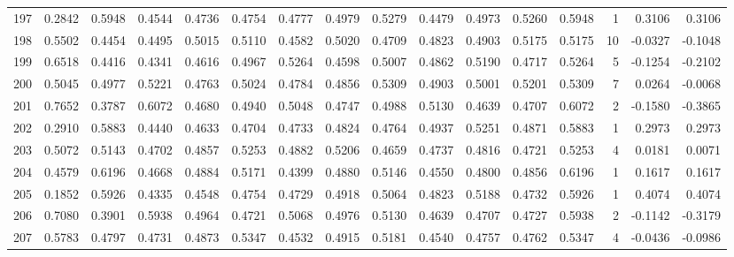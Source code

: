 \begin{tabular}{lrrrrrrrrrrrrrrr}
197 &      0.2842 &  0.5948 &  0.4544 &  0.4736 &  0.4754 &  0.4777 &  0.4979 &  0.5279 &  0.4479 &  0.4973 &   0.5260 &     0.5948 &      1 &                    0.3106 &                     0.3106 \\
198 &      0.5502 &  0.4454 &  0.4495 &  0.5015 &  0.5110 &  0.4582 &  0.5020 &  0.4709 &  0.4823 &  0.4903 &   0.5175 &     0.5175 &     10 &                   -0.0327 &                    -0.1048 \\
199 &      0.6518 &  0.4416 &  0.4341 &  0.4616 &  0.4967 &  0.5264 &  0.4598 &  0.5007 &  0.4862 &  0.5190 &   0.4717 &     0.5264 &      5 &                   -0.1254 &                    -0.2102 \\
200 &      0.5045 &  0.4977 &  0.5221 &  0.4763 &  0.5024 &  0.4784 &  0.4856 &  0.5309 &  0.4903 &  0.5001 &   0.5201 &     0.5309 &      7 &                    0.0264 &                    -0.0068 \\
201 &      0.7652 &  0.3787 &  0.6072 &  0.4680 &  0.4940 &  0.5048 &  0.4747 &  0.4988 &  0.5130 &  0.4639 &   0.4707 &     0.6072 &      2 &                   -0.1580 &                    -0.3865 \\
202 &      0.2910 &  0.5883 &  0.4440 &  0.4633 &  0.4704 &  0.4733 &  0.4824 &  0.4764 &  0.4937 &  0.5251 &   0.4871 &     0.5883 &      1 &                    0.2973 &                     0.2973 \\
203 &      0.5072 &  0.5143 &  0.4702 &  0.4857 &  0.5253 &  0.4882 &  0.5206 &  0.4659 &  0.4737 &  0.4816 &   0.4721 &     0.5253 &      4 &                    0.0181 &                     0.0071 \\
204 &      0.4579 &  0.6196 &  0.4668 &  0.4884 &  0.5171 &  0.4399 &  0.4880 &  0.5146 &  0.4550 &  0.4800 &   0.4856 &     0.6196 &      1 &                    0.1617 &                     0.1617 \\
205 &      0.1852 &  0.5926 &  0.4335 &  0.4548 &  0.4754 &  0.4729 &  0.4918 &  0.5064 &  0.4823 &  0.5188 &   0.4732 &     0.5926 &      1 &                    0.4074 &                     0.4074 \\
206 &      0.7080 &  0.3901 &  0.5938 &  0.4964 &  0.4721 &  0.5068 &  0.4976 &  0.5130 &  0.4639 &  0.4707 &   0.4727 &     0.5938 &      2 &                   -0.1142 &                    -0.3179 \\
207 &      0.5783 &  0.4797 &  0.4731 &  0.4873 &  0.5347 &  0.4532 &  0.4915 &  0.5181 &  0.4540 &  0.4757 &   0.4762 &     0.5347 &      4 &                   -0.0436 &                    -0.0986 \\

\end{tabular}
